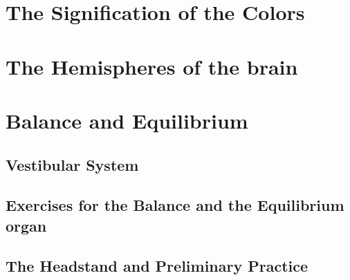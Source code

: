\documentclass[../main.tex]{subfiles}
\begin{document}




\chapter{The Signification of the Colors}



\chapter{The Hemispheres of the brain}



\chapter{Balance and Equilibrium}



\section{Vestibular System}



\newpage
\section[Balance Exercises]{Exercises for the Balance and the Equilibrium organ}



\section[Headstand]{The Headstand and Preliminary Practice}


\end{document}
